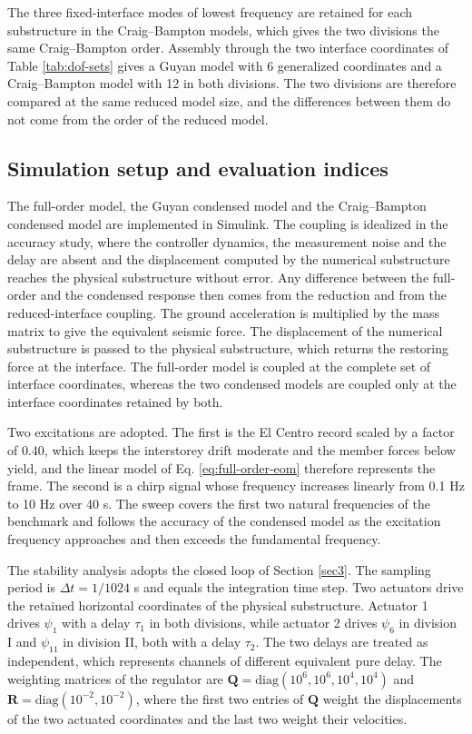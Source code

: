 \documentclass[a4paper,fleqn,review,12pt]{cas-sc}
\numberwithin{equation}{section}
\begin{document}
The three fixed-interface modes of lowest frequency are retained for each substructure in the Craig--Bampton models, which gives the two divisions the same Craig--Bampton order. Assembly through the two interface coordinates of Table \ref{tab:dof-sets} gives a Guyan model with 6 generalized coordinates and a Craig--Bampton model with 12 in both divisions. The two divisions are therefore compared at the same reduced model size, and the differences between them do not come from the order of the reduced model.

\subsection{Simulation setup and evaluation indices}
\label{sec:setup}

The full-order model, the Guyan condensed model and the Craig--Bampton condensed model are implemented in Simulink. The coupling is idealized in the accuracy study, where the controller dynamics, the measurement noise and the delay are absent and the displacement computed by the numerical substructure reaches the physical substructure without error. Any difference between the full-order and the condensed response then comes from the reduction and from the reduced-interface coupling. The ground acceleration is multiplied by the mass matrix to give the equivalent seismic force. The displacement of the numerical substructure is passed to the physical substructure, which returns the restoring force at the interface. The full-order model is coupled at the complete set of interface coordinates, whereas the two condensed models are coupled only at the interface coordinates retained by both.

Two excitations are adopted. The first is the El Centro record scaled by a factor of 0.40, which keeps the interstorey drift moderate and the member forces below yield, and the linear model of Eq. \eqref{eq:full-order-eom} therefore represents the frame. The second is a chirp signal whose frequency increases linearly from 0.1 Hz to 10 Hz over 40 s. The sweep covers the first two natural frequencies of the benchmark and follows the accuracy of the condensed model as the excitation frequency approaches and then exceeds the fundamental frequency.

The stability analysis adopts the closed loop of Section \ref{sec3}. The sampling period is \(\Delta t=1/1024\) s and equals the integration time step. Two actuators drive the retained horizontal coordinates of the physical substructure. Actuator 1 drives \(\psi_{1}\) with a delay \(\tau_{1}\) in both divisions, while actuator 2 drives \(\psi_{6}\) in division I and \(\psi_{11}\) in division II, both with a delay \(\tau_{2}\). The two delays are treated as independent, which represents channels of different equivalent pure delay. The weighting matrices of the regulator are \(\mathbf{Q}=\mathrm{diag}(10^{6},10^{6},10^{4},10^{4})\) and \(\mathbf{R}=\mathrm{diag}(10^{-2},10^{-2})\), where the first two entries of \(\mathbf{Q}\) weight the displacements of the two actuated coordinates and the last two weight their velocities.
\end{document}
